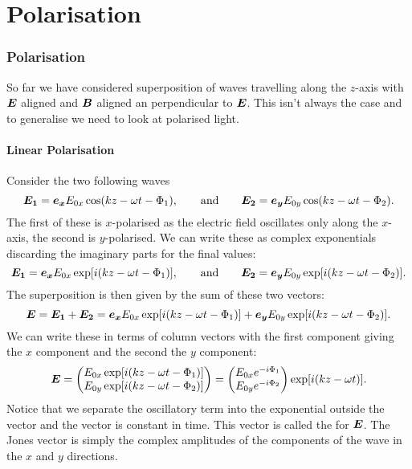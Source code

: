 \part{Polarisation}
    \section{Polarisation}
    So far we have considered superposition of waves travelling along the \(z\)-axis with \(\bm{E}\) aligned and \(\bm{B}\) aligned an perpendicular to \(\bm{E}\).
    This isn't always the case and to generalise we need to look at polarised light.
    
    \subsection{Linear Polarisation}
    Consider the two following waves
    \[\bm{E_1} = \bm{e_{x}}E_{0x}\cos(kz - \omega t - \Phi_1), \qquad\text{and}\qquad \bm{E_2} = \bm{e_{y}}E_{0y}\cos(kz - \omega t - \Phi_2).\]
    The first of these is \(x\)-polarised as the electric field oscillates only along the \(x\)-axis, the second is \(y\)-polarised.
    We can write these as complex exponentials discarding the imaginary parts for the final values:
    \[\bm{E_1} = \bm{e_{x}}E_{0x}\exp[i(kz - \omega t - \Phi_1)], \qquad\text{and}\qquad \bm{E_2} = \bm{e_{y}}E_{0y}\exp[i(kz - \omega t - \Phi_2)].\]
    The superposition is then given by the sum of these two vectors:
    \[\bm{E} = \bm{E_1} + \bm{E_2}= \bm{e_{x}}E_{0x}\exp[i(kz - \omega t - \Phi_1)] + \bm{e_{y}}E_{0y}\exp[i(kz - \omega t - \Phi_2)].\]
    We can write these in terms of column vectors with the first component giving the \(x\) component and the second the \(y\) component:
    \[
        \bm{E} =
        \begin{pmatrix}
            E_{0x}\exp[i(kz - \omega t - \Phi_1)]\\
            E_{0y}\exp[i(kz - \omega t - \Phi_2)]
        \end{pmatrix}
        =
        \begin{pmatrix}
            E_{0x}e^{-i\Phi_1}\\
            E_{0y}e^{-i\Phi_2}
        \end{pmatrix}
        \exp[i(kz - \omega t)].
    \]
    Notice that we separate the oscillatory term into the exponential outside the vector and the vector is constant in time.
    This vector is called the  for \(\bm{E}\).
    The Jones vector is simply the complex amplitudes of the components of the wave in the \(x\) and \(y\) directions.
    
